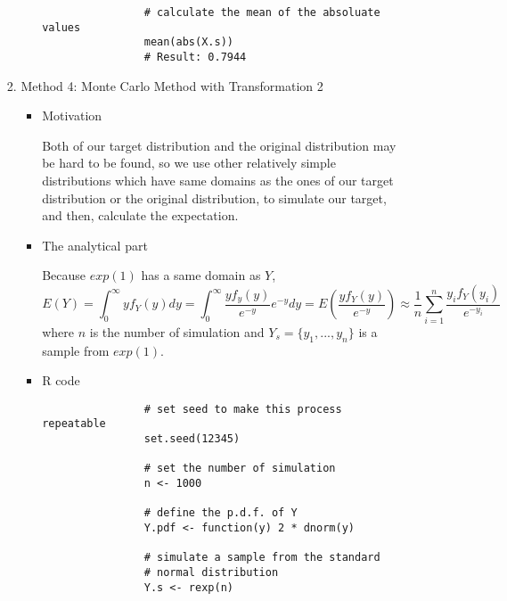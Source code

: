 \documentclass[12pt]{article}
\begin{document}
\begin{enumerate}
\begin{enumerate}
\begin{enumerate}
\begin{itemize}
\begin{verbatim}
				# calculate the mean of the absoluate values
				mean(abs(X.s))
				# Result: 0.7944
				\end{verbatim}
			\end{itemize}
			\item Method 4: Monte Carlo Method with Transformation 2
			\begin{itemize}
				\item Motivation
				\par Both of our target distribution and the original distribution may be hard to be found, so we use other relatively simple distributions which have same domains as the ones of our target distribution or the original distribution, to simulate our target, and then, calculate the expectation.
				\item 
				\par The analytical part
				\par Because $exp(1)$ has a same domain as $Y$, 
				\begin{equation*}
				E(Y) = \int_{0}^{\infty}yf_Y(y)dy = \int_{0}^{\infty}\frac{yf_y(y)}{e^{-y}}e^{-y}dy = E(\frac{yf_Y(y)}{e^{-y}}) \approx \frac{1}{n}\sum_{i=1}^{n}\frac{y_if_Y(y_i)}{e^{-y_i}}
				\end{equation*}
				where $n$ is the number of simulation and $Y_s = \{y_1, ..., y_n\}$ is a sample from $exp(1)$.
				
				\item R code
				\begin{verbatim}
				# set seed to make this process repeatable
				set.seed(12345)
				
				# set the number of simulation
				n <- 1000
				
				# define the p.d.f. of Y
				Y.pdf <- function(y) 2 * dnorm(y)
				
				# simulate a sample from the standard 
				# normal distribution
				Y.s <- rexp(n)
				

\end{verbatim}
\end{itemize}
\end{enumerate}
\end{enumerate}
\end{enumerate}
\end{document}

